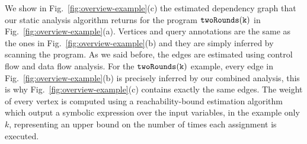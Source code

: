 
%
We show in Fig.~\ref{fig:overview-example}(c) the estimated dependency graph that our static analysis algorithm returns for the program $\mathtt{twoRounds(k)}$ in Fig.~\ref{fig:overview-example}(a).
Vertices and query annotations are the same as the ones in Fig.~\ref{fig:overview-example}(b) and they are simply inferred by scanning the program.
As we said before, the edges are estimated using control flow and data flow analysis.
For the $\mathtt{twoRounds(k)}$ example, every edge in Fig.~\ref{fig:overview-example}(b) is precisely inferred by our combined analysis, this is why Fig.~\ref{fig:overview-example}(c) contains exactly the same edges.
The weight of every vertex is computed using a reachability-bound estimation algorithm which output a symbolic expression over the input variables, in the example only $k$, representing an upper bound on the number of times each assignment is executed.

